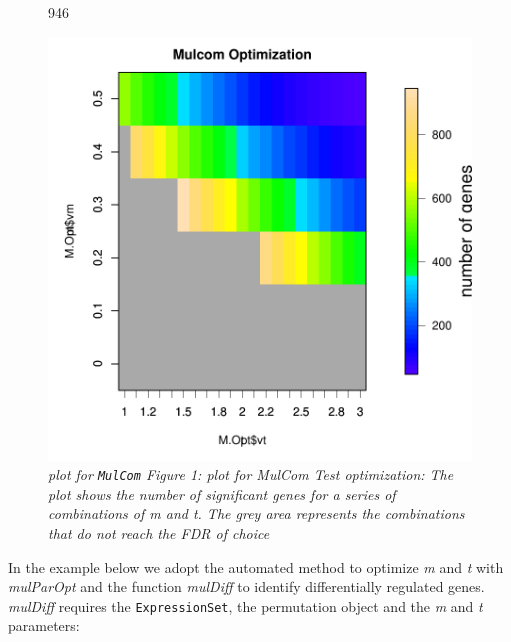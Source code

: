 \documentclass[a4paper]{article}
\begin{document}
\begin{figure}[!ht]
\begin{center}
\begin{Schunk}
\begin{Soutput}
[1] 946
\end{Soutput}
\end{Schunk}
\includegraphics{MulcomVignette-ThresholdOptimization}
\end{center}
\caption{\emph{\scriptsize{plot for \texttt{MulCom} Figure 1: plot for MulCom Test optimization: The plot shows the number of significant
genes for a series of combinations of m and t. The grey area represents the combinations that do not reach the FDR of choice}}}
\end{figure}
\newpage

In the example below we adopt the automated method to optimize \emph{m} and
\emph{t} with \emph{mulParOpt} and the function \emph{mulDiff} to identify differentially regulated
genes. \emph{mulDiff} requires the \texttt{ExpressionSet}, the permutation object and the \emph{m}
and \emph{t} parameters:
\end{document}
